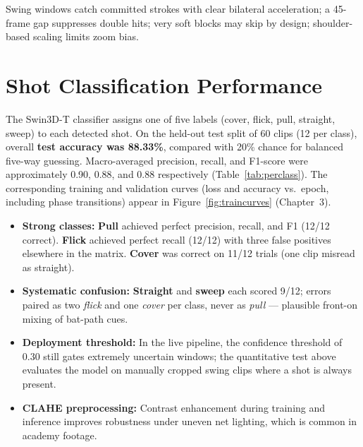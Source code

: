 \begin{justify}
\par Swing windows catch committed strokes with clear bilateral acceleration; a 45-frame gap suppresses double hits; very soft blocks may skip by design; shoulder-based scaling limits zoom bias.

\section{Shot Classification Performance}

\par The Swin3D-T classifier assigns one of five labels (cover, flick, pull, straight, sweep) to each detected shot. On the held-out test split of 60 clips (12 per class), overall \textbf{test accuracy was 88.33\%}, compared with 20\% chance for balanced five-way guessing. Macro-averaged precision, recall, and F1-score were approximately 0.90, 0.88, and 0.88 respectively (Table~\ref{tab:perclass}). The corresponding training and validation curves (loss and accuracy vs.\ epoch, including phase transitions) appear in Figure~\ref{fig:traincurves} (Chapter~3).

\begin{itemize}
    \item \textbf{Strong classes:} \textbf{Pull} achieved perfect precision, recall, and F1 (12/12 correct). \textbf{Flick} achieved perfect recall (12/12) with three false positives elsewhere in the matrix. \textbf{Cover} was correct on 11/12 trials (one clip misread as straight).
    \item \textbf{Systematic confusion:} \textbf{Straight} and \textbf{sweep} each scored 9/12; errors paired as two \textit{flick} and one \textit{cover} per class, never as \textit{pull} --- plausible front-on mixing of bat-path cues.
    \item \textbf{Deployment threshold:} In the live pipeline, the confidence threshold of 0.30 still gates extremely uncertain windows; the quantitative test above evaluates the model on manually cropped swing clips where a shot is always present.
    \item \textbf{CLAHE preprocessing:} Contrast enhancement during training and inference improves robustness under uneven net lighting, which is common in academy footage.
\end{itemize}


\end{justify}
